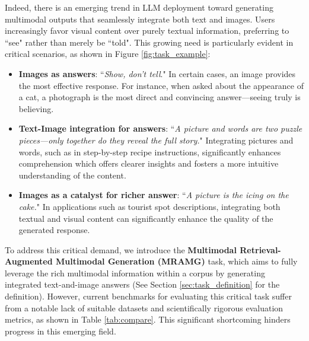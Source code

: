 Indeed, there is an emerging trend in LLM deployment toward generating  multimodal outputs that seamlessly integrate both text and images.
Users increasingly favor visual content over purely textual information, preferring to ``see" rather than merely be ``told".
This growing need is particularly evident in critical scenarios, as shown in Figure \ref{fig:task_example}:
\begin{itemize} 
    \item \textbf{Images as answers}: ``\textit{Show, don't tell}." In certain cases, an image provides the most effective response. For instance, when asked about the appearance of a cat, a photograph is the most direct and convincing answer—seeing truly is believing. 
    \item \textbf{Text-Image integration for 
    answers}: 
    ``\textit{A picture and words are two puzzle pieces—only together do they reveal the full story.}"
    Integrating pictures and words,  such as in step-by-step recipe instructions, significantly enhances comprehension which offers clearer insights and fosters a more intuitive understanding of the content.
    \item %
    \textbf{Images as a catalyst for richer answer}: 
    ``\textit{A picture is the icing on the cake.}" 
    In applications such as tourist spot descriptions, integrating both textual and visual content can significantly enhance the quality of the generated response.
    \end{itemize}
\vspace{-3pt}
To address this critical demand, we introduce the \textbf{Multimodal Retrieval-Augmented Multimodal Generation (MRAMG)} task, which aims to fully leverage the rich multimodal information within a corpus by generating integrated text-and-image answers (See Section \ref{sec:task_definition} for the definition).
However, current benchmarks for evaluating this critical task suffer from a notable lack of suitable datasets and scientifically rigorous evaluation metrics, as shown in Table \ref{tab:compare}. This significant shortcoming hinders progress in this emerging field.



